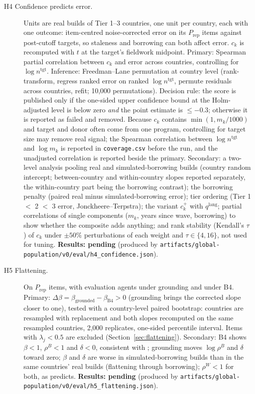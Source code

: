 \documentclass[10pt]{article}
\newcommand{\pending}[1]{\textbf{Results: pending} (produced by \nolinkurl{#1})}
\begin{document}
\begin{description}
  \item[H4 Confidence predicts error.] Units are real builds of Tier 1--3 countries, one unit per country, each with one outcome: item-centred noise-corrected error on its $P_{\text{rep}}$ items against post-cutoff targets, so staleness and borrowing can both affect error. $c_k$ is recomputed with $t$ at the target's fieldwork midpoint. Primary: Spearman partial correlation between $c_k$ and error across countries, controlling for $\log n^{\text{tgt}}$. Inference: Freedman--Lane permutation \citep{freedman1983} at country level (rank-transform, regress ranked error on ranked $\log n^{\text{tgt}}$, permute residuals across countries, refit; 10,000 permutations). Decision rule: the score is published only if the one-sided upper confidence bound at the Holm-adjusted level is below zero \emph{and} the point estimate is $\le -0.3$; otherwise it is reported as failed and removed. Because $c_k$ contains $\min(1, m_k/1000)$ and target and donor often come from one program, controlling for target size may remove real signal; the Spearman correlation between $\log n^{\text{tgt}}$ and $\log m_k$ is reported in \nolinkurl{coverage.csv} before the run, and the unadjusted correlation is reported beside the primary. Secondary: a two-level analysis pooling real and simulated-borrowing builds (country random intercept; between-country and within-country slopes reported separately, the within-country part being the borrowing contrast); the borrowing penalty (paired real minus simulated-borrowing error); tier ordering (Tier 1 $<$ 2 $<$ 3 error, Jonckheere--Terpstra); the variant $c^{+}_k$ with $q^{\text{lang}}$; partial correlations of single components ($m_k$, years since wave, borrowing) to show whether the composite adds anything; and rank stability (Kendall's $\tau$) of $c_k$ under $\pm50\%$ perturbations of each weight and $\tau \in \{4, 16\}$, not used for tuning. \pending{artifacts/global-population/v0/eval/h4_confidence.json}.
  \item[H5 Flattening.] On $P_{\text{rep}}$ items, with evaluation agents under grounding and under B4. Primary: $\Delta\beta = \beta_{\text{grounded}} - \beta_{\text{B4}} > 0$ (grounding brings the corrected slope closer to one), tested with a country-level paired bootstrap: countries are resampled with replacement and both slopes recomputed on the same resampled countries, 2,000 replicates, one-sided percentile interval. Items with $\lambda_j < 0.5$ are excluded (Section~\ref{sec:flattening}). Secondary: B4 shows $\beta<1$, $\rho^B<1$ and $\delta<0$, consistent with \citet{durmus2023,tao2024}; grounding moves $\log\rho^B$ and $\delta$ toward zero; $\beta$ and $\delta$ are worse in simulated-borrowing builds than in the same countries' real builds (flattening through borrowing); $\rho^W<1$ for both, as \citet{jang2026} predicts. \pending{artifacts/global-population/v0/eval/h5_flattening.json}.

\end{description}
\end{document}
